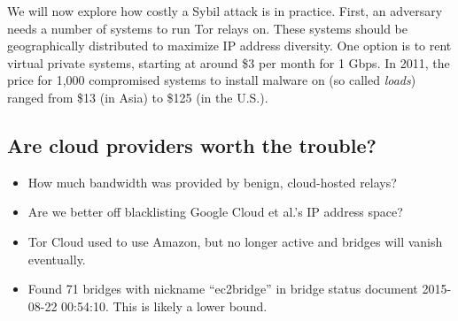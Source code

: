 We will now explore how costly a Sybil attack is in practice.  First, an
adversary needs a number of systems to run Tor relays on.  These systems should
be geographically distributed to maximize IP address diversity.  One option is
to rent virtual private systems, starting at around \$3 per month for 1 Gbps.
In 2011, the price for 1,000 compromised systems to install malware on (so
called \emph{loads}) ranged from \$13 (in Asia) to \$125 (in the U.S.)\cite[\S
5]{Stone-Gross2011a}.


\subsection{Are cloud providers worth the trouble?}
\begin{itemize}
	\item How much bandwidth was provided by benign, cloud-hosted relays?
	\item Are we better off blacklisting Google Cloud et al.'s IP address
		space?
	\item Tor Cloud used to use Amazon, but no longer active and bridges will
		vanish eventually.
	\item Found 71 bridges with nickname ``ec2bridge'' in bridge status document
		2015-08-22 00:54:10.  This is likely a lower bound.
\end{itemize}
